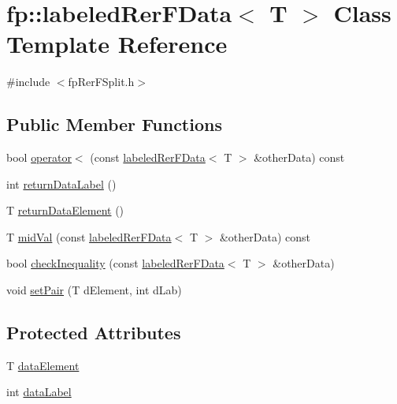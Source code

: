 \hypertarget{classfp_1_1labeledRerFData}{}\section{fp\+:\+:labeled\+Rer\+F\+Data$<$ T $>$ Class Template Reference}
\label{classfp_1_1labeledRerFData}


{\ttfamily \#include $<$fp\+Rer\+F\+Split.\+h$>$}

\subsection*{Public Member Functions}
\begin{DoxyCompactItemize}
\item 
bool \hyperlink{classfp_1_1labeledRerFData_a1df20c9fe02d55ba60210ec2a32721f1}{operator$<$} (const \hyperlink{classfp_1_1labeledRerFData}{labeled\+Rer\+F\+Data}$<$ T $>$ \&other\+Data) const
\item 
int \hyperlink{classfp_1_1labeledRerFData_a00837188cd3075180409f30490a3ccaa}{return\+Data\+Label} ()
\item 
T \hyperlink{classfp_1_1labeledRerFData_adb2f827456257e754cb1ab2a497a1d6e}{return\+Data\+Element} ()
\item 
T \hyperlink{classfp_1_1labeledRerFData_a8e5d0268a82f465278f58e5f1d9c79b5}{mid\+Val} (const \hyperlink{classfp_1_1labeledRerFData}{labeled\+Rer\+F\+Data}$<$ T $>$ \&other\+Data) const
\item 
bool \hyperlink{classfp_1_1labeledRerFData_a4f7bdd5ff9931f899ed534e3d15a6a1a}{check\+Inequality} (const \hyperlink{classfp_1_1labeledRerFData}{labeled\+Rer\+F\+Data}$<$ T $>$ \&other\+Data)
\item 
void \hyperlink{classfp_1_1labeledRerFData_a6442c552436874cc3e4ec2760153d4e7}{set\+Pair} (T d\+Element, int d\+Lab)
\end{DoxyCompactItemize}
\subsection*{Protected Attributes}
\begin{DoxyCompactItemize}
\item 
T \hyperlink{classfp_1_1labeledRerFData_ace341f012e4e282c5a926ccb62246e84}{data\+Element}
\item 
int \hyperlink{classfp_1_1labeledRerFData_a0129409ac4957e14ac1095c9df035b6d}{data\+Label}
\end{DoxyCompactItemize}


